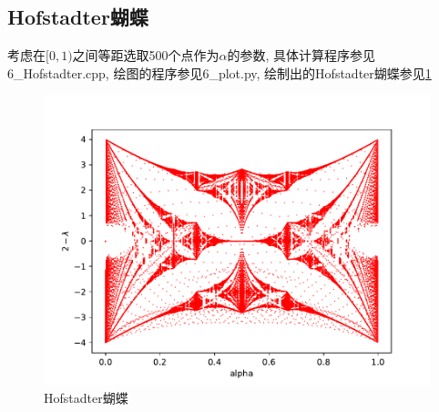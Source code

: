 \documentclass[a4paper,zihao=5,UTF8]{ctexart}
\begin{document}
	\subsection{Hofstadter蝴蝶}
	考虑在$[0, 1)$之间等距选取500个点作为$\alpha$的参数, 具体计算程序参见6\_Hofstadter.cpp, 绘图的程序参见6\_plot.py, 
	绘制出的Hofstadter蝴蝶参见\ref{Hofstadter}
	\begin{figure}
		\centering
		\includegraphics[scale=0.6]{6_Hofstadter_720_500.pdf}
		\caption{Hofstadter蝴蝶}
		\label{Hofstadter}
	\end{figure}
\end{document}
